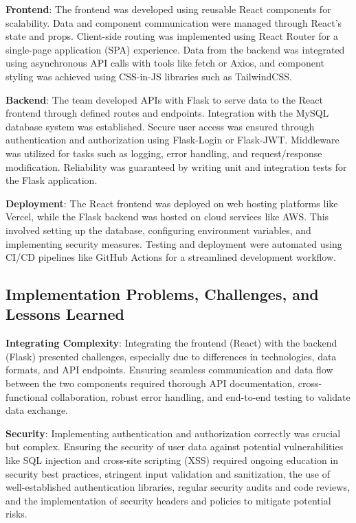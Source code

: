 \documentclass[conference]{IEEEtran}
\begin{document}
\textbf{Frontend}: The frontend was developed using reusable React components for scalability.
Data and component communication were managed through React's state and props. Client-side
routing was implemented using React Router for a single-page application (SPA) experience.
Data from the backend was integrated using asynchronous API calls with tools like fetch or
Axios, and component styling was achieved using CSS-in-JS libraries such as TailwindCSS.

\textbf{Backend}: The team developed APIs with Flask to serve data to the React frontend
through defined routes and endpoints. Integration with the MySQL database system was
established. Secure user access was ensured through authentication and authorization
using Flask-Login or Flask-JWT. Middleware was utilized for tasks such as logging, error
handling, and request/response modification. Reliability was guaranteed by writing unit
and integration tests for the Flask application.

\textbf{Deployment}: The React frontend was deployed on web hosting platforms like Vercel,
while the Flask backend was hosted on cloud services like AWS. This involved setting up
the database, configuring environment variables, and implementing security measures.
Testing and deployment were automated using CI/CD pipelines like GitHub Actions for a
streamlined development workflow.

\subsection{Implementation Problems, Challenges, and Lessons Learned}

\textbf{Integrating Complexity}: Integrating the frontend (React) with the backend (Flask)
presented challenges, especially due to differences in technologies, data formats, and
API endpoints. Ensuring seamless communication and data flow between the two components
required thorough API documentation, cross-functional collaboration, robust error handling,
and end-to-end testing to validate data exchange.

\textbf{Security}: Implementing authentication and authorization correctly was crucial but
complex. Ensuring the security of user data against potential vulnerabilities like SQL
injection and cross-site scripting (XSS) required ongoing education in security best
practices, stringent input validation and sanitization, the use of well-established
authentication libraries, regular security audits and code reviews, and the implementation
of security headers and policies to mitigate potential risks.
\end{document}
